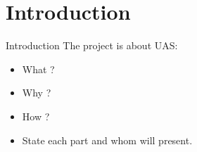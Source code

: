\section{Introduction}

\begin{frame}{Introduction}{}
  The project is about UAS:
  \begin{itemize}
    \item<1-> What ? 
    \item<2-> Why ?
    \item<3-> How ? 
    \item<4-> State each part and whom will present.
  \end{itemize}
\end{frame}

